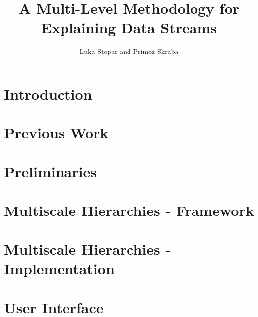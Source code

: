 \documentclass[journal]{vgtc}                %
\title{A Multi-Level Methodology for Explaining Data Streams}
\author{Luka Stopar and Primoz Skraba}
\theoremstyle{definition}
\begin{document}

\maketitle

\section{Introduction}
\label{sec:introduction}





\section{Previous Work}
\label{sec:previous}


\section{Preliminaries}


\section{Multiscale Hierarchies - Framework}
\label{sec:multiscale-framework}



\section{Multiscale Hierarchies - Implementation}
\label{sec:multiscale-implementation}


\section{User Interface}
\label{sec:ui}

\end{document}
